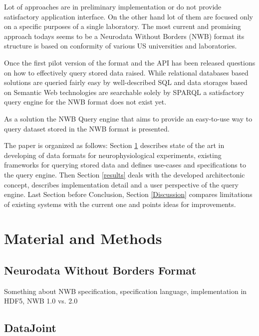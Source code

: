 \documentclass[utf8]{frontiersSCNS} %
\begin{document}
Lot of approaches are in preliminary implementation or do not provide satisfactory application interface. On the other hand lot of them are focused only on a specific purposes of a single laboratory. The most current and promising approach todays seems to be a Neurodata Without Borders (NWB) format its structure is based on conformity of various US universities and laboratories.

Once the first pilot version of the format and the API has been released \citep{teeters-neuron} questions on how to effectively query stored data raised. While relational databases based solutions are queried fairly easy by well-described SQL and data storages based on Semantic Web technologies are searchable solely by SPARQL \citep{prudhommeaux2008sparql} a satisfactory query engine for the NWB format does not exist yet.

As a solution the NWB Query engine that aims to provide an easy-to-use way to query dataset stored in the NWB format is presented.

The paper is organized as follows: Section \ref{materials_and_methods} describes state of the art in developing of data formats for neurophysiological experiments, existing frameworks for querying stored data and defines use-cases and specifications to the query engine. Then Section \ref{results} deals with the developed architectonic concept, describes implementation detail and a user perspective of the query engine. Last Section before Conclusion, Section \ref{Discussion} compares limitations of existing systems with the current one and points ideas for improvements.


\section{Material and Methods}
\label{materials_and_methods}

\subsection{Neurodata Without Borders Format}

Something about NWB specification, specification language, implementation in HDF5, NWB 1.0 vs. 2.0

\subsection{DataJoint}

\citep{Yatsenko031658}
\end{document}
